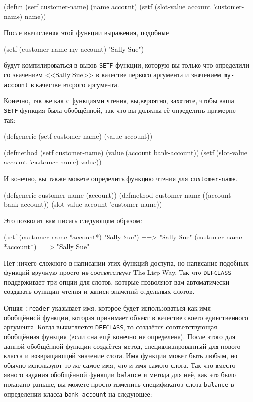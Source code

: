 \begin{myverb}
(defun (setf customer-name) (name account)
  (setf (slot-value account 'customer-name) name))
\end{myverb}

После вычисления этой функции выражения, подобные

\begin{myverb}
(setf (customer-name my-account) "Sally Sue")
\end{myverb}

\noindent{}будут компилироваться в вызов \lstinline{SETF}-функции, которую вы только что определили со
значением <<Sally Sue>> в качестве первого аргумента и значением \lstinline{my-account} в
качестве второго аргумента.

Конечно, так же как с функциями чтения, вы,вероятно, захотите, чтобы ваша
\lstinline{SETF}-функция была обобщённой, так что вы должны её определить примерно так:

\begin{myverb}
(defgeneric (setf customer-name) (value account))

(defmethod (setf customer-name) (value (account bank-account))
  (setf (slot-value account 'customer-name) value))
\end{myverb}

И конечно, вы также можете определить функцию чтения для \lstinline{customer-name}.

\begin{myverb}
(defgeneric customer-name (account))
(defmethod customer-name ((account bank-account))
  (slot-value account 'customer-name))
\end{myverb}

Это позволит вам писать следующим образом:

\begin{myverb}
  (setf (customer-name *account*) "Sally Sue") ==> "Sally Sue"
  (customer-name *account*)                    ==> "Sally Sue"
\end{myverb}

Нет ничего сложного в написании этих функций доступа, но написание подобных функций вручную
просто не соответствует The Lisp Way.  Так что \lstinline{DEFCLASS} поддерживает три опции для
слотов, которые позволяют вам автоматически создавать функции чтения и записи значений
отдельных слотов.

Опция \lstinline{:reader} указывает имя, которое будет использоваться как имя обобщённой
функции, которая принимает объект в качестве своего единственного аргумента.  Когда
вычисляется \lstinline{DEFCLASS}, то создаётся соответствующая обобщённая функция (если
она ещё конечно не определена).  После этого для данной обобщённой функции создаётся
метод, специализированный для нового класса и возвращающий значение слота.  Имя функции
может быть любым, но обычно используют то же самое имя, что и имя самого слота.  Так что
вместо явного задания обобщённой функции \lstinline{balance} и метода для неё, как это
было показано раньше, вы можете просто изменить спецификатор слота \lstinline{balance} в
определении класса \lstinline{bank-account} на следующее:

